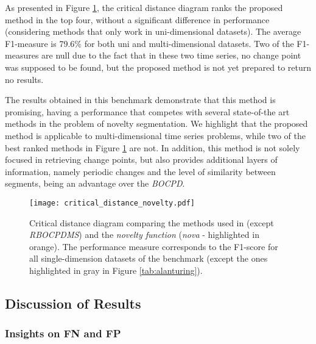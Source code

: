 As presented in Figure \ref{fig:cdd_alant}, the critical distance diagram ranks the proposed method in the top four, without a significant difference in performance (considering methods that only work in uni-dimensional datasets). The average F1-measure is 79.6\% for both uni and multi-dimensional datasets. Two of the F1-measures are null due to the fact that in these two time series, no change point was supposed to be found, but the proposed method is not yet prepared to return no results. 
\par
The results obtained in this benchmark demonstrate that this method is promising, having a performance that competes with several state-of-the art methods in the problem of novelty segmentation. We highlight that the proposed method is applicable to multi-dimensional time series problems, while two of the best ranked methods in Figure \ref{fig:cdd_alant} are not. In addition, this method is not solely focused in retrieving change points, but also provides additional layers of information, namely periodic changes and the level of similarity between segments, being an advantage over the \textit{BOCPD}.

\begin{figure}
    \centering
    \texttt{[image: critical\_distance\_novelty.pdf]}
    \caption{Critical distance diagram comparing the methods used in \cite{cpd_alan} (except \textit{RBOCPDMS}) and the \textit{novelty function} (\textit{nova} - highlighted in orange). The performance measure corresponds to the F1-score for all single-dimension datasets of the benchmark (except the ones highlighted in gray in Figure \ref{tab:alanturing}).}
    \label{fig:cdd_alant}
\end{figure}

\subsection{Discussion of Results}

\subsubsection{Insights on FN and FP}

